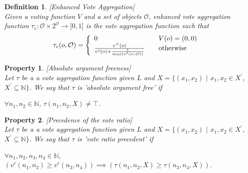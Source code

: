 \documentclass{article}
\newtheorem{definition}{Definition}
\newtheorem{property}{Property}
\newcommand{\nat}{\mathbb{N}}   %
\newcommand{\valueset}{L}
\newcommand{\obj}{\mathcal{O}} %
\begin{document}
\begin{definition}
\label{def:enhVoteAgg}
[Enhanced Vote Aggregation]
\\ Given a voting function $V$ and a set of objects $\obj$, enhanced vote aggregation function
$\tau_{e}:\obj  \times {2}^{\obj} \rightarrow\lbrack0,1]$ is the vote aggregation function such that
\[
\tau_{e}  (o, \mathcal{O})  = \left\{
\begin{array}
[c]{lll}
0 &  & V(o) = (0,0)\\
\frac{v^{+}(o)}{v^{t}(o)+\frac{1}{max(v^{t}(o \cup \mathcal{O}))}} &  & \text{otherwise}%
\end{array}
\right.
\]
\end{definition}


\begin{property}
\label{P1} [Absolute argument freeness] \\
Let $\tau$ be a a vote aggregation function given $\valueset$ and $X = \{(x_{1}, x_{2})$ $|$ $x_{1}, x_{2} \in X^{'}$, $X^{'} \subseteq \nat \}$. We say that $\tau$ is 'absolute argument free' if
\begin{center}
$\forall n_1, n_2 \in \nat$, $\tau (n_1, n_2, X) \neq \top$.
\end{center}
\end{property}



\begin{property}
\label{P2}[Precedence of the vote ratio]\\
Let $\tau$ be a a vote aggregation function given $\valueset$ and $X = \{(x_{1}, x_{2})$ $|$ $x_{1}, x_{2} \in X^{'}$, $X^{'} \subseteq \nat \}$. We say that $\tau$ is 'vote ratio precedent' if
\begin{center}
$\forall n_1, n_2, n_3, n_4 \in \nat$,  \\
$\left( v^{r}(n_{1}, n_{2}) \ge v^{r}(n_{3}, n_{4}) \right) \implies \left( \tau(n_{1}, n_{2}, X) \ge \tau(n_{3}, n_{4}, X) \right)$. \\


\end{center}

\end{property}

\end{document}
